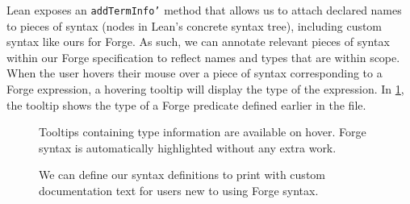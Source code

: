 Lean exposes an \texttt{addTermInfo'} method that allows us to attach declared names to pieces of syntax (nodes in Lean's concrete syntax tree), including custom syntax like ours for Forge. As such, we can annotate relevant pieces of syntax within our Forge specification to reflect names and types that are within scope. When the user hovers their mouse over a piece of syntax corresponding to a Forge expression, a hovering tooltip will display the type of the expression. In \cref{fig:sc-highlighting-hover}, the tooltip shows the type of a Forge predicate defined earlier in the file. 

\begin{figure}
  \centering
  \caption{Tooltips containing type information are available on hover. Forge syntax is automatically highlighted without any extra work.}
  \label{fig:sc-highlighting-hover}
\end{figure}

\begin{figure}
  \begin{center}
  \end{center}
  \begin{center}
    \centering{}
  \end{center}
  \caption{We can define our syntax definitions to print with custom documentation text for users new to using Forge syntax. }
  \label{fig:sc-docstrings}
\end{figure}

